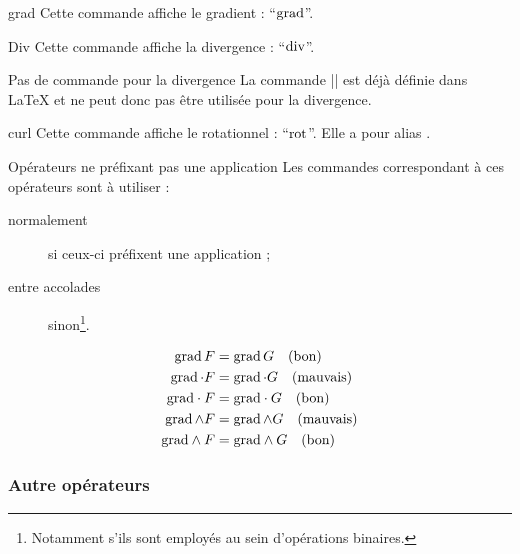 \begin{docCommand}{grad}{}
  Cette commande affiche le gradient : \enquote{$\operatorname{grad}$}.
\end{docCommand}

\begin{docCommand}{Div}{}
  Cette commande affiche la divergence : \enquote{$\operatorname{div}$}.
  \begin{dbremark}{Pas de commande \protect{} pour la divergence}{}
    La commande |\div| est déjà définie dans \LaTeX{} et ne peut donc pas être
    utilisée pour la divergence.
  \end{dbremark}
\end{docCommand}

\begin{docCommand}{curl}{}
  Cette commande affiche le rotationnel :
  \enquote{$\operatorname{rot}$}. Elle a pour alias .
\end{docCommand}

\begin{dbwarning}{Opérateurs ne préfixant pas une application}{}
  Les commandes correspondant à ces opérateurs sont à utiliser :
  \begin{description}
  \item[normalement] si ceux-ci préfixent une application ;
  \item[entre accolades] sinon\footnote{Notamment s'ils sont employés au sein
    d'opérations binaires.}.
  \end{description}
\begin{bodycode}[listing and text,listing options={deletekeywords={[2]{text}}}]
\begin{align}
  \operatorname{grad} F          & = \operatorname{grad} G \quad\text{(bon)}     \\
  \operatorname{grad} \cdot F    & = \operatorname{grad} \cdot G \quad\text{(mauvais)} \\
  {\operatorname{grad}} \cdot F  & = {\operatorname{grad}} \cdot G \quad\text{(bon)}     \\
  \operatorname{grad} \wedge F   & = \operatorname{grad} \wedge G \quad\text{(mauvais)} \\
  {\operatorname{grad}} \wedge F & = {\operatorname{grad}} \wedge G \quad\text{(bon)}
\end{align}
\end{bodycode}
\end{dbwarning}


\subsubsection{Autre opérateurs}
\label{sec:autre-operateurs}

